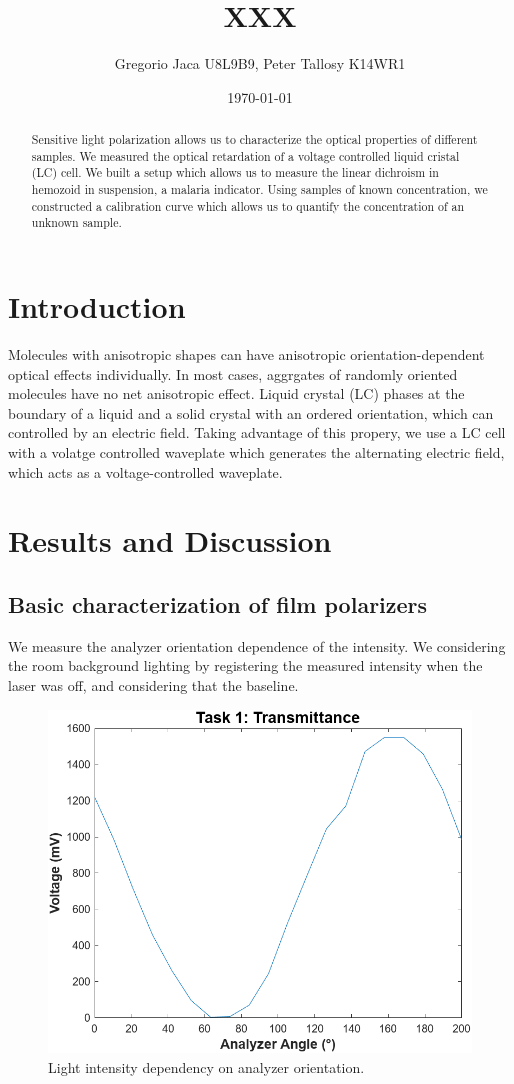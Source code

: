 \documentclass[12pt,a4paper]{article}
\title{XXX}
\author{Gregorio Jaca U8L9B9, Peter Tallosy K14WR1 }
\date{\today}
\begin{document}
\maketitle

\begin{abstract}

    Sensitive light polarization allows us to characterize the optical properties of different samples.
    We measured the optical retardation of a voltage controlled liquid cristal (LC) cell. We built a setup which allows us to measure the linear dichroism in hemozoid in suspension, a malaria indicator. Using samples of known concentration, we constructed a calibration curve which allows us to quantify the concentration of an unknown sample.

\end{abstract}

\section{Introduction}

Molecules with anisotropic shapes can have anisotropic orientation-dependent optical effects individually. In most cases, aggrgates of randomly oriented molecules have no net anisotropic effect. Liquid crystal (LC) phases at the boundary of a liquid and a solid crystal with an ordered orientation, which can controlled by an electric field. Taking advantage of this propery, we use a LC cell with a volatge controlled waveplate which generates the alternating electric field, which acts as a voltage-controlled waveplate.


\section{Results and Discussion}

\subsection{Basic characterization of film polarizers}


We measure the analyzer orientation dependence of the intensity. We considering the room background lighting by registering the measured intensity when the laser was off, and considering that the baseline.

\begin{figure} [H]
    \centering
    \includegraphics[width=0.35\linewidth]{figs/task1_transmittance.png}
    \caption{Light intensity dependency on analyzer orientation.}
    \label{fig:t1}
\end{figure}
\end{document}
